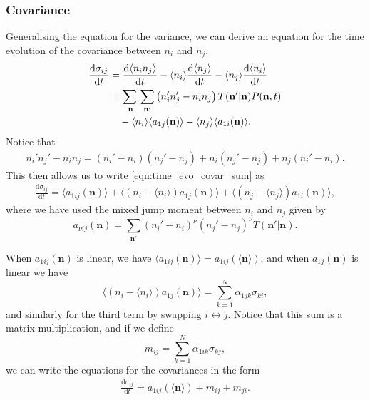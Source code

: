 \documentclass[a4paper,11pt]{article}
\numberwithin{equation}{section}
\newcommand{\diff}[2]{\frac{\mathrm{d} #1}{\mathrm{d} #2}}
\newcommand{\V}[1]{\mathbf{#1}}
\newcommand{\E}[1]{\langle #1 \rangle}
\begin{document}
\subsubsection{Covariance}
Generalising the equation for the variance, we can derive an equation for the
time evolution of the covariance between \(n_i\) and \(n_j\).
\begin{equation}
    \begin{aligned}
        \diff{\sigma_{ij}}{t}
        &= \diff{\E{n_i n_j}}{t} - \E{n_i}\diff{\E{n_j}}{t} -
        \E{n_j}\diff{\E{n_i}}{t}\\
        &= \adjustlimits\sum_{\V{n}} \sum_{\V{n}'}\left(n_i' n_j' - n_i
        n_j\right)T(\V{n}' | \V{n})P(\V{n},t)\\
        & \quad - \E{n_i}\E{a_{1j}(\V{n})} - \E{n_j}\E{a_{1i}(\V{n})}.
    \end{aligned}
    \label{eqn:time_evo_covar_sum}
\end{equation}
Notice that
\begin{align*}
    n_i' n_j' - n_i n_j = (n_i' - n_i)(n_j' - n_j) + n_i(n_j' - n_j) + n_j(n_i'
    - n_i).
\end{align*}
This then allows us to write \eqref{eqn:time_evo_covar_sum} as
\begin{equation}
    \begin{aligned}
        \diff{\sigma_{ij}}{t} = \E{a_{1 i j}(\V{n})} +
        \E{(n_i - \E{n_i})a_{1j}(\V{n})} + \E{(n_j - \E{n_j})a_{1i}(\V{n})},
    \end{aligned}
    \label{eqn:time_evo_covar_jump_moments}
\end{equation}
where we have used the mixed jump moment between \(n_i\) and \(n_j\) given by
\begin{equation}
    a_{\nu i j}(\V{n}) = \sum_{\V{n}'} (n_i' - n_i)^\nu (n_j' - n_j)^\nu
    T(\V{n}' | \V{n}).
    \label{eqn:mixed_jump_moment_i_j}
\end{equation}

When \(a_{1ij}(\V{n})\) is linear, we have \(\E{a_{1ij}(\V{n})} =
a_{1ij}(\E{\V{n}})\), and when \(a_{1j}(\V{n})\) is linear we have
\begin{equation*}
    \E{(n_i - \E{n_i})a_{1j}(\V{n})} = \sum_{k=1}^N \alpha_{1jk} \sigma_{ki},
\end{equation*}
and similarly for the third term by swapping \(i \leftrightarrow j\). Notice
that this sum is a matrix multiplication, and if we define
\begin{equation}
    m_{ij} = \sum_{k=1}^N \alpha_{1ik}\sigma_{kj},
\end{equation}
we can write the equations for the covariances in the form
\begin{equation}
    \begin{aligned}
        \diff{\sigma_{ij}}{t} = a_{1 i j}(\E{\V{n}}) + m_{ij} + m_{ji}.
    \end{aligned}
    \label{eqn:time_evo_covar_linear_jump_moments}
\end{equation}
\end{document}
